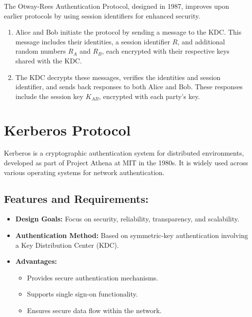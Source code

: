 \documentclass[12pt]{article}
\begin{document}
The Otway-Rees Authentication Protocol, designed in 1987, improves upon earlier protocols by using session identifiers for enhanced security.

\begin{enumerate}
    \item Alice and Bob initiate the protocol by sending a message to the KDC. This message includes their identities, a session identifier \( R \), and additional random numbers \( R_A \) and \( R_B \), each encrypted with their respective keys shared with the KDC.
    \item The KDC decrypts these messages, verifies the identities and session identifier, and sends back responses to both Alice and Bob. These responses include the session key \( K_{AB} \), encrypted with each party's key.
\end{enumerate}
\section*{Kerberos Protocol}

Kerberos is a cryptographic authentication system for distributed environments, developed as part of Project Athena at MIT in the 1980s. It is widely used across various operating systems for network authentication.

\subsection*{Features and Requirements:}
\begin{itemize}
    \item \textbf{Design Goals:} Focus on security, reliability, transparency, and scalability.
    \item \textbf{Authentication Method:} Based on symmetric-key authentication involving a Key Distribution Center (KDC).
    \item \textbf{Advantages:}
    \begin{itemize}
        \item Provides secure authentication mechanisms.
        \item Supports single sign-on functionality.
        \item Ensures secure data flow within the network.
    \end{itemize}
\end{itemize}
\end{document}
